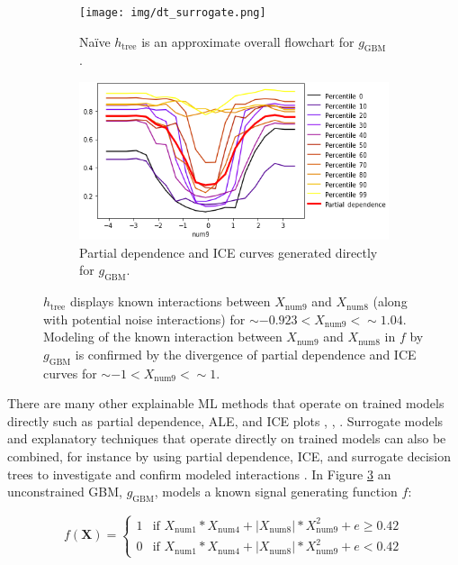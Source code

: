 \documentclass[fleqn]{article}
\newcommand{\twopartdef}[4]
{
	\left\{
		\begin{array}{ll}
			#1 & \mbox{if } #2 \\
			#3 & \mbox{if } #4
		\end{array}
	\right.
}
\begin{document}
\begin{figure}[htb!]
	\begin{subfigure}{.55\textwidth}
		\texttt{[image: img/dt\_surrogate.png]}
  		\caption{Na\"ive $h_{\text{tree}}$ is an approximate overall flowchart for $g_{\text{GBM}}$.}
  		\label{fig:dt_surrogate}
	\end{subfigure}\hspace{5pt}
	\begin{subfigure}{.45\textwidth}
  		\includegraphics[height=.52\linewidth, width=1.02\linewidth]{img/pdp_ice.png}
  		\caption{Partial dependence and ICE curves generated directly for $g_{\text{GBM}}$.}
  		\label{fig:pdp_ice}
	\end{subfigure}
	\caption{$h_{\text{tree}}$ displays known interactions between $X_{\text{num9}}$ and $X_{\text{num8}}$ (along with potential noise interactions) for $\sim -0.923 < X_{\text{num9}} <  \sim 1.04$. Modeling of the known interaction between $X_{\text{num9}}$ and $X_{\text{num8}}$ in $f$ by $g_{\text{GBM}}$ is confirmed by the divergence of partial dependence and ICE curves for $\sim -1 < X_{\text{num9}} <  \sim 1$.}
	\label{fig:pdp_ice_dt_surrogate}
\end{figure}

There are many other explainable ML methods that operate on trained models directly such as partial dependence, ALE, and ICE plots \cite{esl}, \cite{ale_plot}, \cite{ice_plots}. Surrogate models and explanatory techniques that operate directly on trained models can also be combined, for instance by using partial dependence, ICE, and surrogate decision trees to investigate and confirm modeled interactions \cite{art_and_sci}. In Figure \ref{fig:pdp_ice_dt_surrogate} an unconstrained GBM, $g_{\text{GBM}}$, models a known signal generating function $f$:

\begin{equation}
\label{eq:f}
f(\mathbf{X}) = \twopartdef {1} {X_{\text{num}1} * X_{\text{num}4} + |X_{\text{num}8}| * X_{\text{num}9}^2 + e \geq 0.42} {0} {X_{\text{num}1} * X_{\text{num}4} + |X_{\text{num}8}| * X_{\text{num}9}^2 + e < 0.42}
\end{equation}
\end{document}
